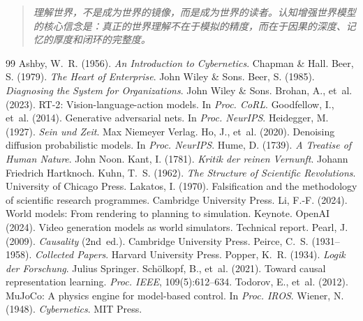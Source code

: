 \documentclass[11pt,a4paper]{article}
\begin{document}
\begin{quote}
\emph{理解世界，不是成为世界的镜像，而是成为世界的读者。认知增强世界模型的核心信念是：真正的世界理解不在于模拟的精度，而在于因果的深度、记忆的厚度和闭环的完整度。}
\end{quote}

\begin{thebibliography}{99}
 Ashby, W.~R. (1956). \emph{An Introduction to Cybernetics}. Chapman \& Hall.
 Beer, S. (1979). \emph{The Heart of Enterprise}. John Wiley \& Sons.
 Beer, S. (1985). \emph{Diagnosing the System for Organizations}. John Wiley \& Sons.
 Brohan, A., et~al. (2023). {RT-2}: Vision-language-action models. In \emph{Proc. CoRL}.
 Goodfellow, I., et~al. (2014). Generative adversarial nets. In \emph{Proc. NeurIPS}.
 Heidegger, M. (1927). \emph{Sein und Zeit}. Max Niemeyer Verlag.
 Ho, J., et~al. (2020). Denoising diffusion probabilistic models. In \emph{Proc. NeurIPS}.
 Hume, D. (1739). \emph{A Treatise of Human Nature}. John Noon.
 Kant, I. (1781). \emph{Kritik der reinen Vernunft}. Johann Friedrich Hartknoch.
 Kuhn, T.~S. (1962). \emph{The Structure of Scientific Revolutions}. University of Chicago Press.
 Lakatos, I. (1970). Falsification and the methodology of scientific research programmes. Cambridge University Press.
 Li, F.-F. (2024). World models: From rendering to planning to simulation. Keynote.
 OpenAI (2024). Video generation models as world simulators. Technical report.
 Pearl, J. (2009). \emph{Causality} (2nd~ed.). Cambridge University Press.
 Peirce, C.~S. (1931--1958). \emph{Collected Papers}. Harvard University Press.
 Popper, K.~R. (1934). \emph{Logik der Forschung}. Julius Springer.
 Sch{\"o}lkopf, B., et~al. (2021). Toward causal representation learning. \emph{Proc. IEEE}, 109(5):612--634.
 Todorov, E., et~al. (2012). {MuJoCo}: A physics engine for model-based control. In \emph{Proc. IROS}.
 Wiener, N. (1948). \emph{Cybernetics}. MIT Press.
\end{thebibliography}
\end{document}
